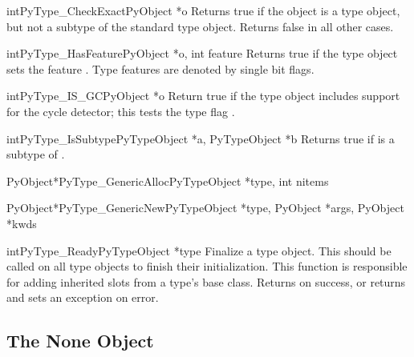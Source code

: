 \begin{cfuncdesc}{int}{PyType_CheckExact}{PyObject *o}
  Returns true if the object  is a type object, but not a
  subtype of the standard type object.  Returns false in all other
  cases.
\end{cfuncdesc}

\begin{cfuncdesc}{int}{PyType_HasFeature}{PyObject *o, int feature}
  Returns true if the type object  sets the feature
  .  Type features are denoted by single bit flags.
\end{cfuncdesc}

\begin{cfuncdesc}{int}{PyType_IS_GC}{PyObject *o}
  Return true if the type object includes support for the cycle
  detector; this tests the type flag .
\end{cfuncdesc}

\begin{cfuncdesc}{int}{PyType_IsSubtype}{PyTypeObject *a, PyTypeObject *b}
  Returns true if  is a subtype of .
\end{cfuncdesc}

\begin{cfuncdesc}{PyObject*}{PyType_GenericAlloc}{PyTypeObject *type,
                                                  int nitems}
\end{cfuncdesc}

\begin{cfuncdesc}{PyObject*}{PyType_GenericNew}{PyTypeObject *type,
                                            PyObject *args, PyObject *kwds}
\end{cfuncdesc}

\begin{cfuncdesc}{int}{PyType_Ready}{PyTypeObject *type}
  Finalize a type object.  This should be called on all type objects
  to finish their initialization.  This function is responsible for
  adding inherited slots from a type's base class.  Returns 
  on success, or returns  and sets an exception on error.
\end{cfuncdesc}


\subsection{The None Object \label{noneObject}}

